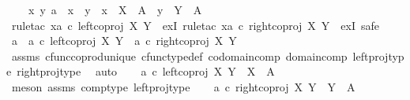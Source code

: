 \begin{isabellebody}
\ \ \ {\isachardoublequoteopen}{\isasymexists}\ x\ y{\isachardot}{\kern0pt}\ a\ {\isacharequal}{\kern0pt}\ {\isacharparenleft}{\kern0pt}x\ {\isasymamalg}\ y{\isacharparenright}{\kern0pt}\ {\isasymand}\ x\ {\isacharcolon}{\kern0pt}\ X\ {\isasymrightarrow}\ A\ {\isasymand}\ y\ {\isacharcolon}{\kern0pt}\ Y\ {\isasymrightarrow}\ A{\isachardoublequoteclose}\isanewline
%
\isadelimproof
%
\endisadelimproof
%
\isatagproof
{}\isamarkupfalse%
\ {\isacharparenleft}{\kern0pt}rule{\isacharunderscore}{\kern0pt}tac\ x{\isacharequal}{\kern0pt}{\isachardoublequoteopen}a\ {\isasymcirc}\isactrlsub c\ left{\isacharunderscore}{\kern0pt}coproj\ X\ Y{\isachardoublequoteclose}\ \ exI{\isacharcomma}{\kern0pt}\ rule{\isacharunderscore}{\kern0pt}tac\ x{\isacharequal}{\kern0pt}{\isachardoublequoteopen}a\ {\isasymcirc}\isactrlsub c\ right{\isacharunderscore}{\kern0pt}coproj\ X\ Y{\isachardoublequoteclose}\ \ exI{\isacharcomma}{\kern0pt}\ safe{\isacharparenright}{\kern0pt}\isanewline
\ \ \isamarkupfalse%
\ {\isachardoublequoteopen}a\ {\isacharequal}{\kern0pt}\ {\isacharparenleft}{\kern0pt}a\ {\isasymcirc}\isactrlsub c\ left{\isacharunderscore}{\kern0pt}coproj\ X\ Y{\isacharparenright}{\kern0pt}\ {\isasymamalg}\ {\isacharparenleft}{\kern0pt}a\ {\isasymcirc}\isactrlsub c\ right{\isacharunderscore}{\kern0pt}coproj\ X\ Y{\isacharparenright}{\kern0pt}{\isachardoublequoteclose}\isanewline
\ \ \ \ \isamarkupfalse%
\ assms\ cfunc{\isacharunderscore}{\kern0pt}coprod{\isacharunderscore}{\kern0pt}unique\ cfunc{\isacharunderscore}{\kern0pt}type{\isacharunderscore}{\kern0pt}def\ codomain{\isacharunderscore}{\kern0pt}comp\ domain{\isacharunderscore}{\kern0pt}comp\ left{\isacharunderscore}{\kern0pt}proj{\isacharunderscore}{\kern0pt}type\ right{\isacharunderscore}{\kern0pt}proj{\isacharunderscore}{\kern0pt}type\ \isamarkupfalse%
\ auto\isanewline
\ \ \isamarkupfalse%
\ {\isachardoublequoteopen}a\ {\isasymcirc}\isactrlsub c\ left{\isacharunderscore}{\kern0pt}coproj\ X\ Y\ {\isacharcolon}{\kern0pt}\ X\ {\isasymrightarrow}\ A{\isachardoublequoteclose}\isanewline
\ \ \ \ \isamarkupfalse%
\ {\isacharparenleft}{\kern0pt}meson\ assms\ comp{\isacharunderscore}{\kern0pt}type\ left{\isacharunderscore}{\kern0pt}proj{\isacharunderscore}{\kern0pt}type{\isacharparenright}{\kern0pt}\isanewline
\ \ \isamarkupfalse%
\ {\isachardoublequoteopen}a\ {\isasymcirc}\isactrlsub c\ right{\isacharunderscore}{\kern0pt}coproj\ X\ Y\ {\isacharcolon}{\kern0pt}\ Y\ {\isasymrightarrow}\ A{\isachardoublequoteclose}\isanewline

\end{isabellebody}
